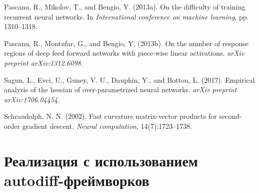 \documentclass[11pt]{article}
\begin{document}
\begin{thebibliography}{10}
  Pascanu, R., Mikolov, T., and Bengio, Y. (2013a).
  \newblock On the difficulty of training recurrent neural networks.
  \newblock In \textit{International conference on machine learning}, pp. 1310--1318.

  Pascanu, R., Montufar, G., and Bengio, Y. (2013b).
  \newblock On the number of response regions of deep feed forward networks with piece-wise linear activations.
  \newblock \textit{arXiv preprint arXiv:1312.6098}.

  Sagun, L., Evci, U., Guney, V. U., Dauphin, Y., and Bottou, L. (2017).
  \newblock Empirical analysis of the hessian of over-parametrized neural networks.
  \newblock \textit{arXiv preprint arXiv:1706.04454}.

  Schraudolph, N. N. (2002).
  \newblock Fast curvature matrix-vector products for second-order gradient descent.
  \newblock \textit{Neural computation}, 14(7):1723--1738.
\end{thebibliography}

\newpage
\appendix
\section{Реализация с использованием autodiff-фреймворков}
\end{document}
